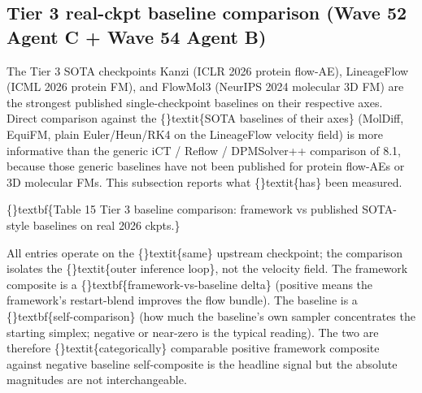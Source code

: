\documentclass{article}
\begin{document}
\subsection{Tier 3 real-ckpt baseline comparison (Wave 52 Agent C + Wave 54 Agent B)}
The Tier 3 SOTA checkpoints  Kanzi (ICLR 2026 protein flow-AE), LineageFlow (ICML 2026 protein FM), and FlowMol3 (NeurIPS 2024 molecular 3D FM)  are the strongest published single-checkpoint baselines on their respective axes. Direct comparison against the \{\}textit\{SOTA baselines of their axes\} (MolDiff, EquiFM, plain Euler/Heun/RK4 on the LineageFlow velocity field) is more informative than the generic iCT / Reflow / DPMSolver++ comparison of 8.1, because those generic baselines have not been published for protein flow-AEs or 3D molecular FMs. This subsection reports what \{\}textit\{has\} been measured.

\{\}textbf\{Table 15  Tier 3 baseline comparison: framework vs published SOTA-style baselines on real 2026 ckpts.\}

All entries operate on the \{\}textit\{same\} upstream checkpoint; the comparison isolates the \{\}textit\{outer inference loop\}, not the velocity field. The framework composite is a \{\}textbf\{framework-vs-baseline delta\} (positive means the framework's restart-blend improves the flow bundle). The baseline  is a \{\}textbf\{self-comparison\} (how much the baseline's own sampler concentrates the starting simplex; negative or near-zero is the typical reading). The two are therefore \{\}textit\{categorically\} comparable  positive framework composite against negative baseline self-composite is the headline signal  but the absolute magnitudes are not interchangeable.
\end{document}
